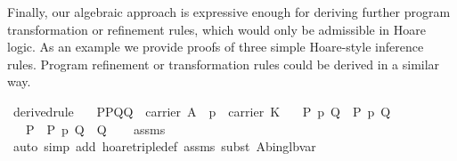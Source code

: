\documentclass{llncs}
\begin{document}
Finally, our algebraic approach is expressive enough for deriving
further program transformation or refinement rules, which would only
be admissible in Hoare logic. As an example we provide proofs of three
simple Hoare-style inference rules. Program refinement or
transformation rules could be derived in a similar way.

\begin{isabellebody}
\isanewline
{}\isamarkupfalse%
\ derived{}rule{}{}\isanewline
\ \ \ {}{}P{}{}P{}{}Q{}{}Q{}{}\ {}\ carrier\ A{}\ \ {}p\ {}\ carrier\ K{}\isanewline
\ \ \ {}{}P{}{}\ p\ {}Q{}{}{}\ \ {}{}P{}{}\ p\ {}Q{}{}{}\isanewline
\ \ \ {}{}P{}\ {}\ P{}{}\ p\ {}Q{}\ {}\ Q{}{}{}\isanewline
%
\isadelimproof
\ \ %
\endisadelimproof
%
\isatagproof
{}\isamarkupfalse%
\ assms\isanewline
\ \ \isamarkupfalse%
\ {}auto\ simp\ add{}\ hoare{}triple{}def\ assms{}\ subst\ A{}bin{}glb{}var{}\isanewline

\end{isabellebody}
\end{document}
